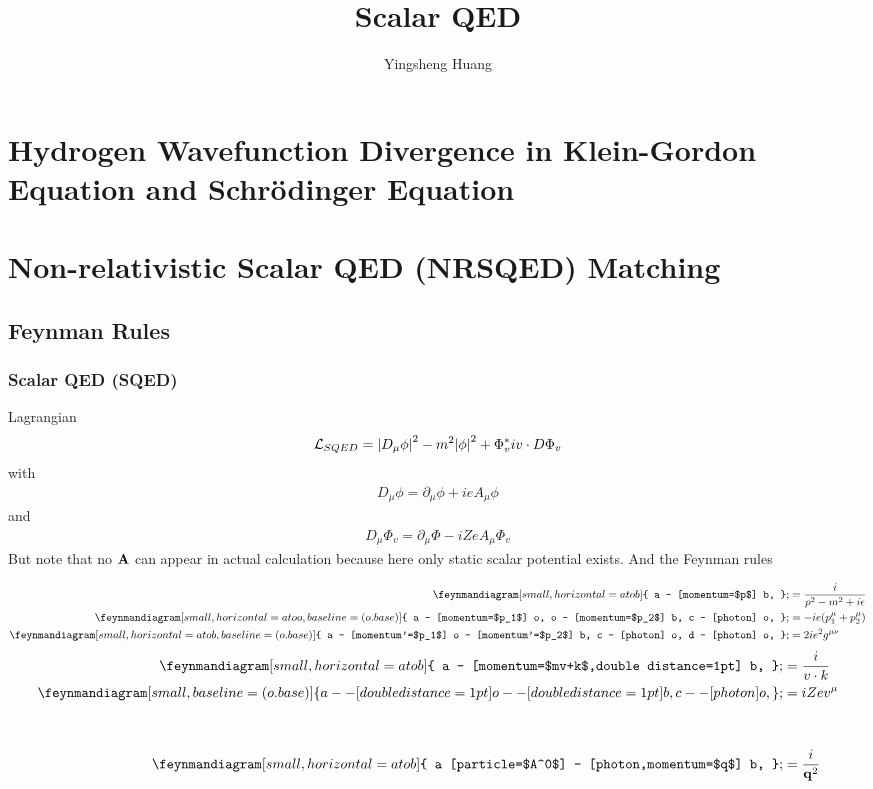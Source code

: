 \documentclass{article}
\title{Scalar QED}
\author{Yingsheng Huang}
\newcommand{\lag}{\mathcal{L}}
\begin{document}
\maketitle
\section{Hydrogen Wavefunction Divergence in Klein-Gordon Equation and Schr\"odinger Equation}


\section{Non-relativistic Scalar QED (NRSQED) Matching}
\subsection{Feynman Rules}
\subsubsection{Scalar QED (SQED)}
Lagrangian
\begin{align}
  \lag_{SQED}=\abs{D_{\mu}\phi}^2-m^2\abs{\phi}^2+\Phi_v^*iv\cdot D\Phi_v
  \label{SQEDLAG}
\end{align}
with
\begin{align*}
  D_{\mu}\phi=\partial_{\mu}\phi+ieA_{\mu}\phi
\end{align*}
and 
\begin{align*}
  D_{\mu}\Phi_v=\partial_{\mu}\Phi-iZeA_{\mu}\Phi_v
\end{align*}
But note that no $\vb{A}$ can appear in actual calculation because here only static scalar potential exists. 
And the Feynman rules
\begin{multicols}{2}
  \begin{align*}
	\feynmandiagram[small,horizontal=a to b]{
	a -- [momentum=$p$] b,
    };&=\frac{i}{p^2-m^2+i\epsilon}\\
	\feynmandiagram[small,horizontal=a to o,baseline=(o.base)]{
	  a -- [momentum=$p_1$] o,
	  o -- [momentum=$p_2$] b,
	  c -- [photon] o,
	};&=-ie(p_1^{\mu}+p_2^{\mu})\\
	\feynmandiagram[small,horizontal=a to b,baseline=(o.base)]{
	  a -- [momentum'=$p_1$] o -- [momentum'=$p_2$] b,
	  c -- [photon] o,
	  d -- [photon] o,
	};&=2ie^2g^{\mu\nu}
  \end{align*}
  \begin{align*}
	\feynmandiagram[small,horizontal=a to b]{
		a -- [momentum=$mv+k$,double distance=1pt] b,
	};&=\frac{i}{v\cdot k}\\
	\feynmandiagram[small,baseline=(o.base)]{
	  a -- [double distance=1pt] o -- [double distance=1pt] b,
	  c -- [photon] o,
	};&=iZev^{\mu}\\\\\\
	\feynmandiagram[small,horizontal=a to b]{
	  a [particle=$A^0$] -- [photon,momentum=$q$] b,
	};&=\frac{i}{\vb{q}^2}
  \end{align*}
\end{multicols}
\end{document}
